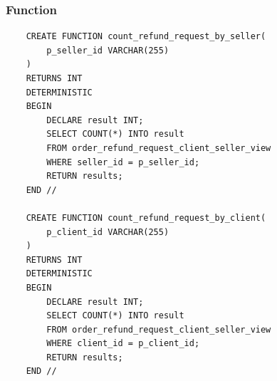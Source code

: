  \subsubsection{Function}

 \begin{verbatim}
    CREATE FUNCTION count_refund_request_by_seller(
        p_seller_id VARCHAR(255)
    )
    RETURNS INT
    DETERMINISTIC
    BEGIN
        DECLARE result INT;
        SELECT COUNT(*) INTO result
        FROM order_refund_request_client_seller_view
        WHERE seller_id = p_seller_id;
        RETURN results;
    END //

    CREATE FUNCTION count_refund_request_by_client(
        p_client_id VARCHAR(255)
    )
    RETURNS INT
    DETERMINISTIC
    BEGIN
        DECLARE result INT;
        SELECT COUNT(*) INTO result
        FROM order_refund_request_client_seller_view
        WHERE client_id = p_client_id;
        RETURN results;
    END //
 \end{verbatim}
